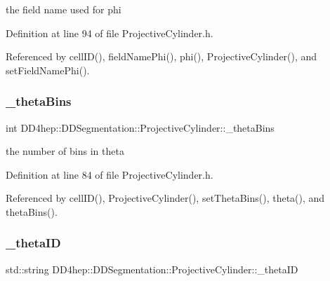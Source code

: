 the field name used for phi 



Definition at line 94 of file Projective\+Cylinder.\+h.



Referenced by cell\+I\+D(), field\+Name\+Phi(), phi(), Projective\+Cylinder(), and set\+Field\+Name\+Phi().

\hypertarget{class_d_d4hep_1_1_d_d_segmentation_1_1_projective_cylinder_a3a9abd6b200a4093f80607c63cb60a27}{}\label{class_d_d4hep_1_1_d_d_segmentation_1_1_projective_cylinder_a3a9abd6b200a4093f80607c63cb60a27} 
\subsubsection{\texorpdfstring{\+\_\+theta\+Bins}{\_thetaBins}}
{\footnotesize\ttfamily int D\+D4hep\+::\+D\+D\+Segmentation\+::\+Projective\+Cylinder\+::\+\_\+theta\+Bins\hspace{0.3cm}{\ttfamily [protected]}}



the number of bins in theta 



Definition at line 84 of file Projective\+Cylinder.\+h.



Referenced by cell\+I\+D(), Projective\+Cylinder(), set\+Theta\+Bins(), theta(), and theta\+Bins().

\hypertarget{class_d_d4hep_1_1_d_d_segmentation_1_1_projective_cylinder_aa236579151e799c5aee4526a2fbbbdb2}{}\label{class_d_d4hep_1_1_d_d_segmentation_1_1_projective_cylinder_aa236579151e799c5aee4526a2fbbbdb2} 
\subsubsection{\texorpdfstring{\+\_\+theta\+ID}{\_thetaID}}
{\footnotesize\ttfamily std\+::string D\+D4hep\+::\+D\+D\+Segmentation\+::\+Projective\+Cylinder\+::\+\_\+theta\+ID\hspace{0.3cm}{\ttfamily [protected]}}




